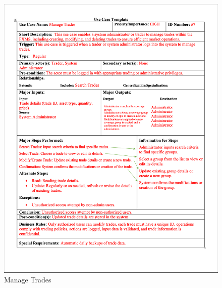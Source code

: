 \documentclass[a4paper]{report}
\begin{document}
\begin{figure}[h!]
    \centering
    \includegraphics[width=\textwidth]{images/uc/7-manage-trades.png}
    \caption{Manage Trades}
    \label{fig:7-manage-trades}
\end{figure}
\end{document}
